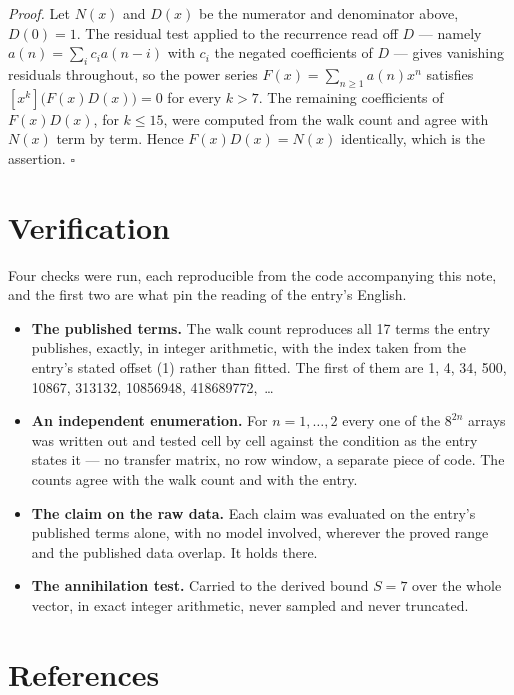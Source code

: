 \documentclass[11pt]{article}
\theoremstyle{definition}
\begin{document}
{\itshape Proof.} Let $N(x)$ and $D(x)$ be the numerator and denominator above, $D(0)=1$. The residual test applied to the recurrence read off $D$ --- namely $a(n) = \sum_i c_i a(n-i)$ with $c_i$ the negated coefficients of $D$ --- gives vanishing residuals throughout, so the power series $F(x)=\sum_{n\ge 1}a(n)x^n$ satisfies $[x^k]\bigl(F(x)D(x)\bigr) = 0$ for every $k > 7$. The remaining coefficients of $F(x)D(x)$, for $k \le 15$, were computed from the walk count and agree with $N(x)$ term by term. Hence $F(x)D(x) = N(x)$ identically, which is the assertion. $\square$

\section{Verification}

Four checks were run, each reproducible from the code accompanying this note, and the first two are what pin the reading of the entry's English.

\begin{itemize}

\item {\bfseries The published terms.} The walk count reproduces all 17 terms the entry publishes, exactly, in integer arithmetic, with the index taken from the entry's stated offset (1) rather than fitted. The first of them are 1, 4, 34, 500, 10867, 313132, 10856948, 418689772,~\dots

\item {\bfseries An independent enumeration.} For $n = 1,\dots,2$ every one of the $8^{2n}$ arrays was written out and tested cell by cell against the condition as the entry states it --- no transfer matrix, no row window, a separate piece of code. The counts agree with the walk count and with the entry.

\item {\bfseries The claim on the raw data.} Each claim was evaluated on the entry's published terms alone, with no model involved, wherever the proved range and the published data overlap. It holds there.

\item {\bfseries The annihilation test.} Carried to the derived bound $S = 7$ over the whole vector, in exact integer arithmetic, never sampled and never truncated.

\end{itemize}

\section{References}
\end{document}
